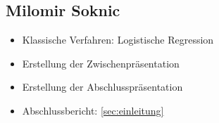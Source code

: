 \begin{multicols}{2}
\subsection{Milomir Soknic}
\begin{itemize}
    \item Klassische Verfahren: Logistische Regression
    \item Erstellung der Zwischenpräsentation
    \item Erstellung der Abschlusspräsentation
    \item Abschlussbericht: \ref{sec:einleitung}
\end{itemize}

\end{multicols}
